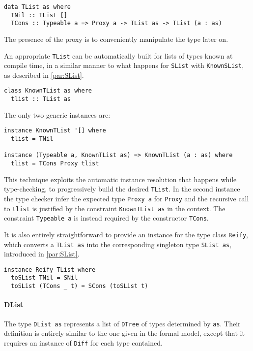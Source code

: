 \documentclass[../Thesis.tex]{subfiles}
\begin{document}
\begin{verbatim}
data TList as where
  TNil :: TList []
  TCons :: Typeable a => Proxy a -> TList as -> TList (a : as)
\end{verbatim}
	The presence of the proxy is to conveniently manipulate the type later on.
	
	An appropriate \texttt{TList} can be automatically built for lists of types 
	known at compile time, in a similar manner to what happens for
	\texttt{SList} with \texttt{KnownSList}, as described in \ref{par:SList}.
	
\begin{verbatim}
class KnownTList as where
  tlist :: TList as
\end{verbatim}
	The only two generic instances are:
\begin{verbatim}
instance KnownTList '[] where
  tlist = TNil

instance (Typeable a, KnownTList as) => KnownTList (a : as) where
  tlist = TCons Proxy tlist
\end{verbatim}

	This technique exploits the automatic instance resolution that happens
	while type-checking, to progressively build the desired \texttt{TList}.
	In the second instance the type checker infer the expected type 
	\texttt{Proxy a} for \texttt{Proxy} and the recursive call to \texttt{tlist} is 
	justified by the constraint  \texttt{KnownTList as} in the context. 
	The constraint \texttt{Typeable a} is instead required by
	the constructor \texttt{TCons}.
		
	It is also entirely straightforward to provide an instance for the 
	type	class \texttt{Reify}, which converts a \texttt{TList as} 
	into the corresponding singleton type 
	\texttt{SList as}, introduced in \ref{par:SList}. 

\begin{verbatim}
instance Reify TList where
  toSList TNil = SNil
  toSList (TCons _ t) = SCons (toSList t)
\end{verbatim}
	
	\paragraph{DList}
	The type \texttt{DList as} represents a list of \texttt{DTree} of types
	determined by 	\texttt{as}. Their definition is entirely similar to
	the one given in the formal model, except that it requires
	an instance of \texttt{Diff} for each type contained.
	
\end{document}
